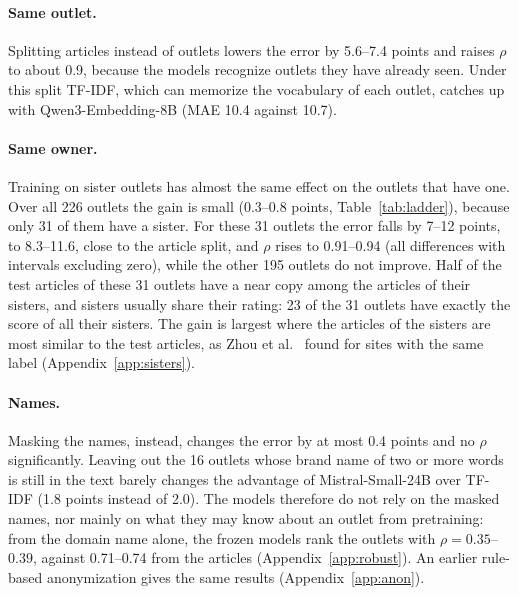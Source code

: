 \documentclass[11pt,a4paper]{article}
\begin{document}
\paragraph{Same outlet.} Splitting articles instead of outlets lowers the error by 5.6--7.4 points and raises $\rho$ to
about 0.9, because the models recognize outlets they have already seen. Under this split TF-IDF, which can memorize the
vocabulary of each outlet, catches up with Qwen3-Embedding-8B (MAE 10.4 against 10.7).

\paragraph{Same owner.} Training on sister outlets has almost the same effect on the outlets that have one. Over all
226 outlets the gain is small (0.3--0.8 points, Table~\ref{tab:ladder}), because only 31 of them have a sister. For
these 31 outlets the error falls by 7--12 points, to 8.3--11.6, close to the article split, and $\rho$ rises to
0.91--0.94 (all differences with intervals excluding zero), while the other 195 outlets do not improve. Half of the test articles of these 31 outlets have a near copy among the articles of their sisters, and sisters
usually share their rating: 23 of the 31 outlets have exactly the score of all their sisters. The gain is largest where
the articles of the sisters are most similar to the test articles, as Zhou et al.~\cite{zhou2021hidden} found for sites
with the same label (Appendix~\ref{app:sisters}).

\paragraph{Names.} Masking the names, instead, changes the error by at most 0.4 points and no $\rho$ significantly.
Leaving out the 16 outlets whose brand name of two or more words is still in the text barely changes the advantage of
Mistral-Small-24B over TF-IDF (1.8 points instead of 2.0). The models therefore do not rely on the masked names, nor
mainly on what they may know about an outlet from pretraining: from the domain name alone, the frozen models rank the
outlets with $\rho = 0.35$--$0.39$, against 0.71--0.74 from the articles (Appendix~\ref{app:robust}). An
earlier rule-based anonymization gives the same results (Appendix~\ref{app:anon}).
\end{document}
